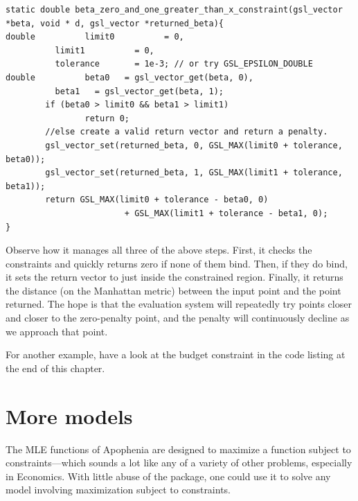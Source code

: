 \begin{lstlisting}
static double beta_zero_and_one_greater_than_x_constraint(gsl_vector *beta, void * d, gsl_vector *returned_beta){
double          limit0          = 0,
          limit1          = 0,
          tolerance       = 1e-3; // or try GSL_EPSILON_DOUBLE
double          beta0   = gsl_vector_get(beta, 0),
          beta1   = gsl_vector_get(beta, 1);
        if (beta0 > limit0 && beta1 > limit1)
                return 0;
        //else create a valid return vector and return a penalty.
        gsl_vector_set(returned_beta, 0, GSL_MAX(limit0 + tolerance, beta0)); 
        gsl_vector_set(returned_beta, 1, GSL_MAX(limit1 + tolerance, beta1));
        return GSL_MAX(limit0 + tolerance - beta0, 0) 
                        + GSL_MAX(limit1 + tolerance - beta1, 0); 
}
\end{lstlisting}

Observe how it manages all three of the above steps. First, it checks
the constraints and quickly returns zero if none of them bind. Then, if
they do bind, it sets the return vector to just inside the constrained
region. Finally, it returns the distance (on the Manhattan metric)
between the input point and the point returned. The hope is that the
evaluation system will repeatedly try points closer and closer to the
zero-penalty point, and the penalty will continuously decline as we
approach that point.

For another example, have a look at the budget constraint in the code
listing at the end of this chapter.


\section{More models}    \label{econ101}

The MLE functions of Apophenia are designed to maximize a function
subject to constraints---which sounds a lot like any of a variety of
other problems, especially in Economics. With little abuse of the package,
one could use it to solve any model involving maximization
subject to constraints.  

